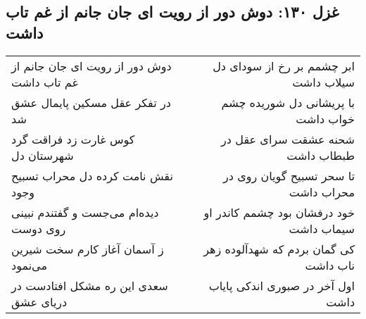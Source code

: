 \begin{center}
\section*{غزل ۱۳۰: دوش دور از رویت ای جان جانم از غم تاب داشت}
\label{sec:130}
\begin{longtable}{l p{0.5cm} r}
دوش دور از رویت ای جان جانم از غم تاب داشت
&&
ابر چشمم بر رخ از سودای دل سیلاب داشت
\\
در تفکر عقل مسکین پایمال عشق شد
&&
با پریشانی دل شوریده چشم  خواب داشت
\\
کوس غارت زد فراقت گرد شهرستان دل
&&
شحنه عشقت سرای عقل در طبطاب داشت
\\
نقش نامت کرده دل محراب تسبیح وجود
&&
تا سحر تسبیح گویان روی در محراب داشت
\\
دیده‌ام می‌جست و گفتندم نبینی روی دوست
&&
خود درفشان بود چشمم کاندر او سیماب داشت
\\
ز آسمان آغاز کارم سخت شیرین می‌نمود
&&
کی گمان بردم که شهدآلوده زهر ناب داشت
\\
سعدی این ره مشکل افتادست در دریای عشق
&&
اول آخر در صبوری اندکی پایاب داشت
\\
\end{longtable}
\end{center}

